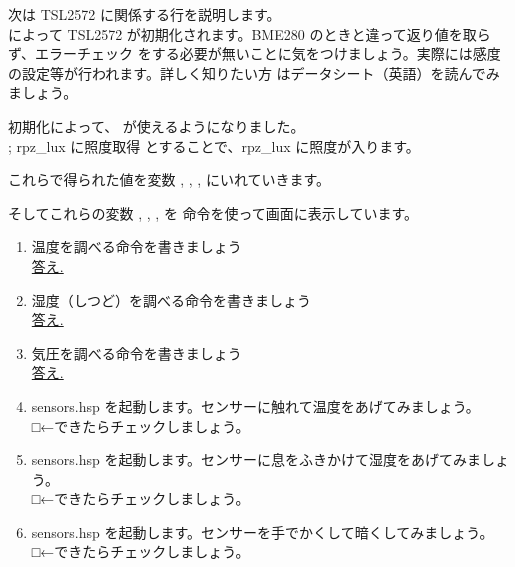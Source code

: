 次は TSL2572 に関係する行を説明します。\\
によって TSL2572 が初期化されます。BME280 のときと違って返り値を取らず、エラーチェック
をする必要が無いことに気をつけましょう。実際には感度の設定等が行われます。詳しく知りたい方
はデータシート（英語）を読んでみましょう。

初期化によって、 が使えるようになりました。 \\
 ; rpz\_lux に照度取得
とすることで、rpz\_lux に照度が入ります。

これらで得られた値を変数 , , ,  にいれていきます。\\

そしてこれらの変数 , , ,  を  命令を使って画面に表示しています。\\

\begin{tcolorbox}[title=\useOmetoi]
\begin{enumerate}
\item 温度を調べる命令を書きましょう\\
\underline{答え.\hspace{0.8\linewidth}}
\item 湿度（しつど）を調べる命令を書きましょう\\
\underline{答え.\hspace{0.8\linewidth}}
\item 気圧を調べる命令を書きましょう\\
\underline{答え.\hspace{0.8\linewidth}}
\item sensors.hsp を起動します。センサーに触れて温度をあげてみましょう。\\
□←できたらチェックしましょう。
\item sensors.hsp を起動します。センサーに息をふきかけて湿度をあげてみましょう。\\
□←できたらチェックしましょう。
\item  sensors.hsp を起動します。センサーを手でかくして暗くしてみましょう。\\
□←できたらチェックしましょう。
\end{enumerate}
\end{tcolorbox}